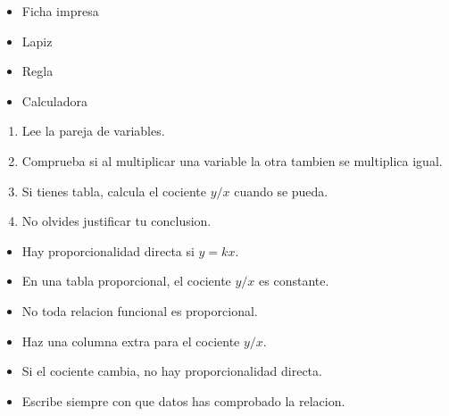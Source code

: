 \documentclass[12pt,a4paper]{article}
\begin{document}
        \FichaCabecera

        \begin{materialesbox}
        \begin{itemize}
    \item Ficha impresa
    \item Lapiz
    \item Regla
    \item Calculadora
\end{itemize}
        \end{materialesbox}

        \begin{pasosbox}
        \begin{enumerate}
    \item Lee la pareja de variables.
    \item Comprueba si al multiplicar una variable la otra tambien se multiplica igual.
    \item Si tienes tabla, calcula el cociente $y/x$ cuando se pueda.
    \item No olvides justificar tu conclusion.
\end{enumerate}
        \end{pasosbox}

        \begin{recordatoriobox}
        \begin{itemize}
    \item Hay proporcionalidad directa si $y=kx$.
    \item En una tabla proporcional, el cociente $y/x$ es constante.
    \item No toda relacion funcional es proporcional.
\end{itemize}
        \end{recordatoriobox}

        \begin{apoyobox}
        \begin{itemize}
    \item Haz una columna extra para el cociente $y/x$.
    \item Si el cociente cambia, no hay proporcionalidad directa.
    \item Escribe siempre con que datos has comprobado la relacion.
\end{itemize}
        \end{apoyobox}


\end{document}
